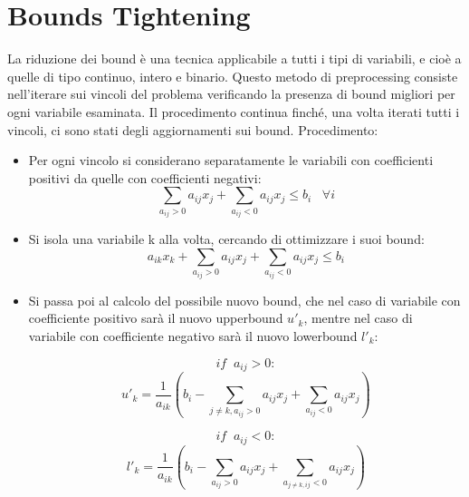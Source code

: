 \documentclass{article}
\begin{document}
\section{Bounds Tightening}

La riduzione dei bound è una tecnica applicabile a tutti i tipi di variabili, e cioè a quelle di tipo continuo, intero e binario.
\newline
\newline
Questo metodo di preprocessing consiste nell'iterare sui vincoli del problema verificando la presenza di bound migliori per ogni variabile esaminata. Il procedimento continua finché, una volta iterati tutti i vincoli, ci sono stati degli aggiornamenti sui bound.
\newline
\newline
Procedimento:
\begin{itemize}
\item Per ogni vincolo si considerano separatamente le variabili con coefficienti positivi da quelle con coefficienti negativi:
\[
\sum_{a_{ij}>0}a_{ij} x_{j} + \sum_{a_{ij}<0}a_{ij} x_{j} \le b_i  \;\;\;\forall i
\] 
\item Si isola una variabile k alla volta, cercando di ottimizzare i suoi bound:
\[
a_{ik} x_{k} + \sum_{a_{ij}>0}a_{ij} x_{j} + \sum_{a_{ij}<0}a_{ij} x_{j} \le b_i
\]
\item Si passa poi al calcolo del possibile nuovo bound, che nel caso di variabile con coefficiente positivo sarà il nuovo upperbound $u'_k$, mentre nel caso di variabile con coefficiente negativo sarà il nuovo lowerbound $l'_k$:

\[
if\;\;a_{ij}>0:\]
\[
u'_k = \frac{1}{a_{ik}}\left(b_i - \sum_{j\ne k,a_{ij}>0}a_{ij} x_{j} + \sum_{a_{ij}<0}a_{ij} x_{j}\right)
\]

\[
if\;\;a_{ij}<0:\]
\[
l'_k = \frac{1}{a_{ik}}\left(b_i - \sum_{a_{ij}>0}a_{ij} x_{j} + \sum_{a_{j\ne k,ij}<0}a_{ij} x_{j}\right)
\]

\end{itemize}
\end{document}
